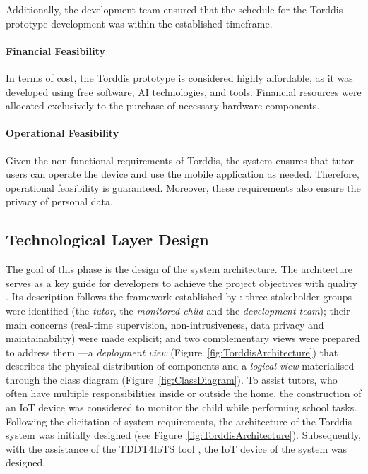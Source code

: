                 Additionally, the development team ensured that the schedule for the Torddis prototype development was within the established timeframe.
                
                \paragraph{Financial Feasibility}
                In terms of cost, the Torddis prototype is considered highly affordable, as it was developed using free software, AI technologies, and tools. Financial resources were allocated exclusively to the purchase of necessary hardware components.
                
                \paragraph{Operational Feasibility}
                Given the non-functional requirements of Torddis, the system ensures that tutor users can operate the device and use the mobile application as needed. Therefore, operational feasibility is guaranteed. Moreover, these requirements also ensure the privacy of personal data.
                
                \subsection{Technological Layer Design}
                The goal of this phase is the design of the system architecture. The architecture serves as a key guide for developers to achieve the project objectives with quality \citep{Liu2011Status}. Its description follows the framework established by \citet{ISO-IEC-IEEE42010-2022}: three stakeholder groups were identified (the \textit{tutor}, the \textit{monitored child} and the \textit{development team}); their main concerns (real-time supervision, non-intrusiveness, data privacy and maintainability) were made explicit; and two complementary views were prepared to address them —a \emph{deployment view} (Figure~\ref{fig:TorddisArchitecture}) that describes the physical distribution of components and a \emph{logical view} materialised through the class diagram (Figure~\ref{fig:ClassDiagram}). To assist tutors, who often have multiple responsibilities inside or outside the home, the construction of an IoT device was considered to monitor the child while performing school tasks. Following the elicitation of system requirements, the architecture of the Torddis system was initially designed (see Figure~\ref{fig:TorddisArchitecture}). Subsequently, with the assistance of the TDDT4IoTS tool \citep{Guerrero2024Test}, the IoT device of the system was designed.
                
